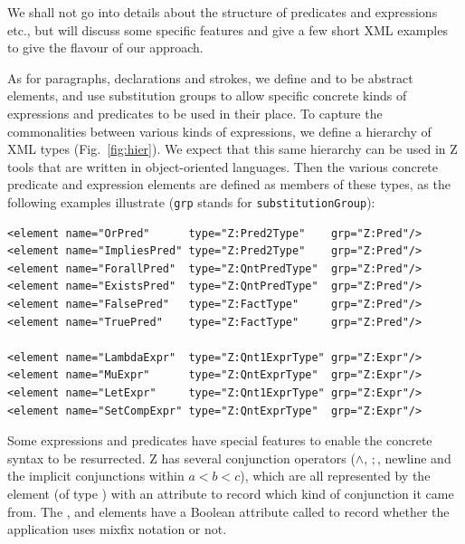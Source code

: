 \documentclass{llncs}  %
\begin{document}
We shall not go into details about the structure of predicates and
expressions etc., but will discuss some specific features and give
a few short XML examples to give the flavour of our approach.

As for paragraphs, declarations and strokes, we define 
and  to be abstract elements, and use substitution
groups to allow specific concrete kinds of expressions and predicates to be
used in their place.  To capture the commonalities between various 
kinds of expressions, we define a hierarchy of XML types
(Fig.~\ref{fig:hier}).   We expect that this same hierarchy can be
used in Z tools that are written in object-oriented languages.
Then the various concrete predicate and
expression elements are defined as members of these types, as the
following examples illustrate (\verb!grp! stands for
\verb!substitutionGroup!):
\begin{small}
\begin{verbatim}
<element name="OrPred"      type="Z:Pred2Type"    grp="Z:Pred"/>
<element name="ImpliesPred" type="Z:Pred2Type"    grp="Z:Pred"/>
<element name="ForallPred"  type="Z:QntPredType"  grp="Z:Pred"/>
<element name="ExistsPred"  type="Z:QntPredType"  grp="Z:Pred"/>
<element name="FalsePred"   type="Z:FactType"     grp="Z:Pred"/>
<element name="TruePred"    type="Z:FactType"     grp="Z:Pred"/>

<element name="LambdaExpr"  type="Z:Qnt1ExprType" grp="Z:Expr"/>
<element name="MuExpr"      type="Z:QntExprType"  grp="Z:Expr"/>
<element name="LetExpr"     type="Z:Qnt1ExprType" grp="Z:Expr"/>
<element name="SetCompExpr" type="Z:QntExprType"  grp="Z:Expr"/>
\end{verbatim}
\end{small}

Some expressions and predicates have special features to enable the
concrete syntax to be resurrected.  Z has several
conjunction operators ($\land$, $;$, newline and the implicit conjunctions
within $a < b < c$), which are all represented by the 
element (of type ) with an attribute to record which
kind of conjunction it came from.  The , 
and  elements have a Boolean attribute called 
to record whether the application uses mixfix notation or not.
\end{document}
